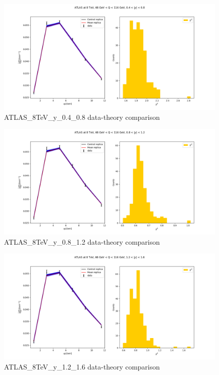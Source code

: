 \documentclass[
]{article}
\begin{document}
\begin{figure}
\centering
\includegraphics{pngplots/ATLAS_8TeV_y_0.4_0.8.png}
\caption{ATLAS\_8TeV\_y\_0.4\_0.8 data-theory comparison}
\end{figure}

\begin{figure}
\centering
\includegraphics{pngplots/ATLAS_8TeV_y_0.8_1.2.png}
\caption{ATLAS\_8TeV\_y\_0.8\_1.2 data-theory comparison}
\end{figure}

\begin{figure}
\centering
\includegraphics{pngplots/ATLAS_8TeV_y_1.2_1.6.png}
\caption{ATLAS\_8TeV\_y\_1.2\_1.6 data-theory comparison}
\end{figure}
\end{document}
